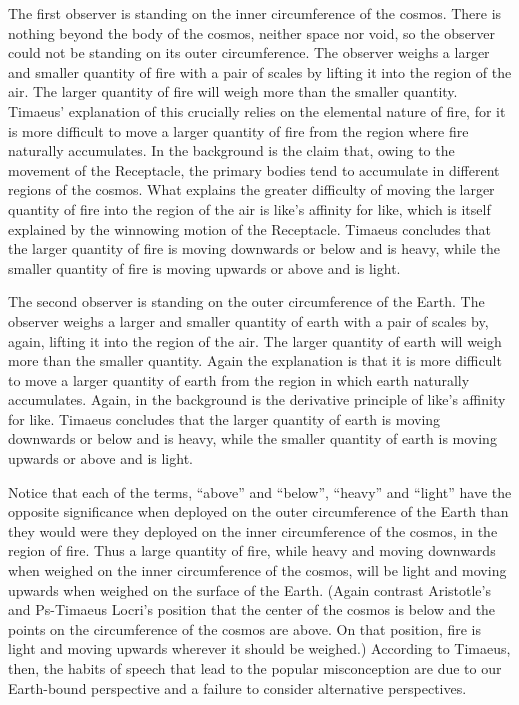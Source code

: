 The first observer is standing on the inner circumference of the cosmos. There is nothing beyond the body of the cosmos, neither space nor void, so the observer could not be standing on its outer circumference. The observer weighs a larger and smaller quantity of fire with a pair of scales by lifting it into the region of the air. The larger quantity of fire will weigh more than the smaller quantity. Timaeus' explanation of this crucially relies on the elemental nature of fire, for it is more difficult to move a larger quantity of fire from the region where fire naturally accumulates. In the background is the claim that, owing to the movement of the Receptacle, the primary bodies tend to accumulate in different regions of the cosmos. What explains the greater difficulty of moving the larger quantity of fire into the region of the air is like's affinity for like, which is itself explained by the winnowing motion of the Receptacle. Timaeus concludes that the larger quantity of fire is moving downwards or below and is heavy, while the smaller quantity of fire is moving upwards or above and is light.

The second observer is standing on the outer circumference of the Earth. The observer weighs a larger and smaller quantity of earth with a pair of scales by, again, lifting it into the region of the air. The larger quantity of earth will weigh more than the smaller quantity. Again the explanation is that it is more difficult to move a larger quantity of earth from the region in which earth naturally accumulates. Again, in the background is the derivative principle of like's affinity for like. Timaeus concludes that the larger quantity of earth is moving downwards or below and is heavy, while the smaller quantity of earth is moving upwards or above and is light.

Notice that each of the terms, ``above'' and ``below'', ``heavy'' and ``light'' have the opposite significance when deployed on the outer circumference of the Earth than they would were they deployed on the inner circumference of the cosmos, in the region of fire. Thus a large quantity of fire, while heavy and moving downwards when weighed on the inner circumference of the cosmos, will be light and moving upwards when weighed on the surface of the Earth. (Again contrast Aristotle's and Ps-Timaeus Locri's position that the center of the cosmos is below and the points on the circumference of the cosmos are above. On that position, fire is light and moving upwards wherever it should be weighed.) According to Timaeus, then, the habits of speech that lead to the popular misconception are due to our Earth-bound perspective and a failure to consider alternative perspectives.

